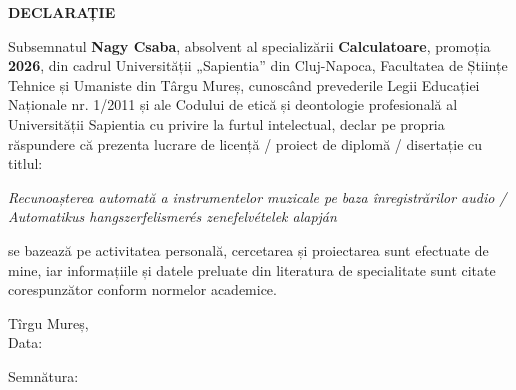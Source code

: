 \thispagestyle{empty}

\begin{center}
  \vspace*{2cm}
  {\Large\bfseries DECLARAȚIE\par}
  \vspace{2cm}
\end{center}

Subsemnatul \textbf{Nagy Csaba}, absolvent al specializării \textbf{Calculatoare}, promoția \textbf{2026}, din cadrul Universității „Sapientia” din Cluj-Napoca, Facultatea de Științe Tehnice și Umaniste din Târgu Mureș, cunoscând prevederile Legii Educației Naționale nr. 1/2011 și ale Codului de etică și deontologie profesională al Universității Sapientia cu privire la furtul intelectual, declar pe propria răspundere că prezenta lucrare de licență / proiect de diplomă / disertație cu titlul:
\begin{center}
  \textit{Recunoașterea automată a instrumentelor muzicale pe baza înregistrărilor audio / Automatikus hangszerfelismerés zenefelvételek alapján}
\end{center}
se bazează pe activitatea personală, cercetarea și proiectarea sunt efectuate de mine, iar informațiile și datele preluate din literatura de specialitate sunt citate corespunzător conform normelor academice.

\vspace{5cm}

\noindent
\begin{minipage}[t]{0.48\textwidth}
  \raggedright
  Tîrgu Mureș,\\
  Data: \makebox[3cm]{\dotfill}
\end{minipage}\hfill
\begin{minipage}[t]{0.48\textwidth}
  \raggedright
  Semnătura:\\
  \vspace{0.35cm}
  \makebox[4.5cm]{\dotfill}
\end{minipage}

\clearpage
